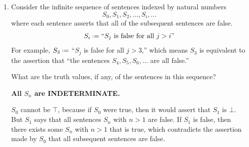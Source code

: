 \documentclass[12pt]{article}
\newcommand{\defeq}{\mathrel{\vcenter{\baselineskip0.5ex \lineskiplimit0pt \hbox{\scriptsize.}\hbox{\scriptsize.}}}=}
\begin{document}
\begin{enumerate}[left=0pt, itemsep=2em, parsep=1em]
\begin{enumerate}[label=(\alph*), itemsep=1.5em, leftmargin=2em]
        
      \item
        ``If this sentence is false, then $7$ is a prime number.''
        
        \textbf{TRUE.}
        
        Let $A \defeq$ ``If $A$ is false, then 7 is a prime number.'' and $B \defeq$ ``7 is prime''. Then $A \defeq$ $\neg A \Rightarrow B$.
        If $A$ is false then $\neg A$ is true, which implies $B$ has to be true. $B$ is obviously true, which means this is consistent. 
        If $A$ is true then $\neg A$ is false, which means $B$ is not dependent on $A$ and can be either $\top$ or $\bot$, thus this is still consistent. 
        
        
      \item
        ``If this sentence is true, then $7$ is not a prime number.''
        
        \textbf{FALSE.}
        
        Let $A \defeq$ ``If $A$ is true, then $7$ is not a prime number.'' and $B \defeq$ ``$7$ is not prime''. Then $A \defeq A \Rightarrow B$.
        If $A$ is true then it implies $B$ has to be true. But $B$ is obviously false, so this is inconsistent.
        If $A$ is false then it means $B$ is not dependent on $A$ and can be either $\top$ or $\bot$, thus this is consistent. So $A$ has to be $\bot$.

    \end{enumerate}

  \item
    Consider the infinite sequence of sentences indexed by natural numbers
    \begin{equation*}
      S_0, S_1, S_2, \ldots, S_i, \ldots
    \end{equation*}
    where each sentence asserts that all of the subsequent sentences are false.
    \begin{equation*}
      S_i \defeq \text{``}S_j \text{ is false for all } j > i\text{''}
    \end{equation*}
    For example, $S_3 \defeq$ ``$S_j$ is false for all $j > 3$,'' which means $S_3$ is equivalent to the assertion that ``the sentences $S_4, S_5, S_6, \dots$ are all false.''
    
    What are the truth values, if any, of the sentences in this sequence?
    

    \textbf{All $S_n$ are INDETERMINATE.}
    
    $S_0$ cannot be $\top$, because if $S_0$ were true, then it would assert that $S_1$ is $\bot$.  
    But $S_1$ says that all sentences $S_n$ with $n>1$ are false.  
    If $S_1$ is false, then there exists some $S_n$ with $n>1$ that is true, which contradicts the assertion made by $S_0$ that all subsequent sentences are false.
    

\end{enumerate}
\end{document}
